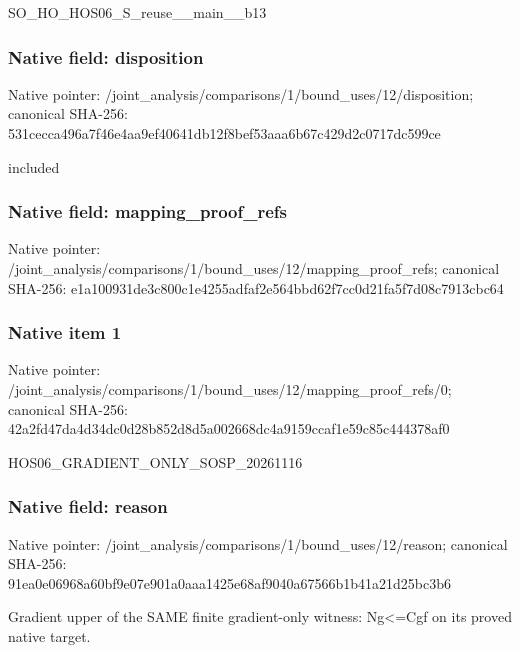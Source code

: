 \documentclass[10pt,a4paper]{article}
\begin{document}
\begingroup\raggedright\sloppy SO\_\allowbreak{}HO\_\allowbreak{}HOS06\_\allowbreak{}S\_\allowbreak{}reuse\_\allowbreak{}\_\allowbreak{}main\_\allowbreak{}\_\allowbreak{}b13\par\endgroup

\subsubsection{Native field: disposition}
Native pointer: /joint\_\allowbreak{}analysis/comparisons/1/bound\_\allowbreak{}uses/12/disposition; canonical SHA-256: 531cecca496a7f46e4aa9ef40641db12f8bef53aaa6b67c429d2c0717dc599ce

\begingroup\raggedright\sloppy included\par\endgroup

\subsubsection{Native field: mapping\_\allowbreak{}proof\_\allowbreak{}refs}
Native pointer: /joint\_\allowbreak{}analysis/comparisons/1/bound\_\allowbreak{}uses/12/mapping\_\allowbreak{}proof\_\allowbreak{}refs; canonical SHA-256: e1a100931de3c800c1e4255adfaf2e564bbd62f7cc0d21fa5f7d08c7913cbc64

\subsubsection{Native item 1}
Native pointer: /joint\_\allowbreak{}analysis/comparisons/1/bound\_\allowbreak{}uses/12/mapping\_\allowbreak{}proof\_\allowbreak{}refs/0; canonical SHA-256: 42a2fd47da4d34dc0d28b852d8d5a002668dc4a9159ccaf1e59c85c444378af0

\begingroup\raggedright\sloppy HOS06\_\allowbreak{}GRADIENT\_\allowbreak{}ONLY\_\allowbreak{}SOSP\_\allowbreak{}20261116\par\endgroup

\subsubsection{Native field: reason}
Native pointer: /joint\_\allowbreak{}analysis/comparisons/1/bound\_\allowbreak{}uses/12/reason; canonical SHA-256: 91ea0e06968a60bf9e07e901a0aaa1425e68af9040a67566b1b41a21d25bc3b6

\begingroup\raggedright\sloppy Gradient upper of the SAME finite gradient-only witness:\allowbreak{} Ng<=\allowbreak{}Cgf on its proved native target.\par\endgroup
\end{document}

